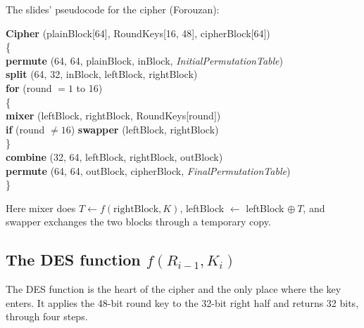 The slides' pseudocode for the cipher (Forouzan):
\begin{center}
\begin{minipage}{0.8\textwidth}\small
\textbf{Cipher} (plainBlock[64], RoundKeys[16, 48], cipherBlock[64])\\
\{\\
\hspace*{1.5em}\textbf{permute} (64, 64, plainBlock, inBlock, \emph{InitialPermutationTable})\\
\hspace*{1.5em}\textbf{split} (64, 32, inBlock, leftBlock, rightBlock)\\
\hspace*{1.5em}\textbf{for} (round $= 1$ to 16)\\
\hspace*{1.5em}\{\\
\hspace*{3em}\textbf{mixer} (leftBlock, rightBlock, RoundKeys[round])\\
\hspace*{3em}\textbf{if} (round $\neq 16$) \textbf{swapper} (leftBlock, rightBlock)\\
\hspace*{1.5em}\}\\
\hspace*{1.5em}\textbf{combine} (32, 64, leftBlock, rightBlock, outBlock)\\
\hspace*{1.5em}\textbf{permute} (64, 64, outBlock, cipherBlock, \emph{FinalPermutationTable})\\
\}
\end{minipage}
\end{center}
Here mixer does $T \leftarrow f(\text{rightBlock}, K)$, leftBlock $\leftarrow$ leftBlock $\oplus\ T$, and swapper exchanges the two blocks through a temporary copy.

\subsection{The DES function $f(R_{i-1}, K_i)$ \hot}
The DES function is the heart of the cipher and the only place where the key enters. It applies the 48-bit round key to the 32-bit right half and returns 32 bits, through four steps.

